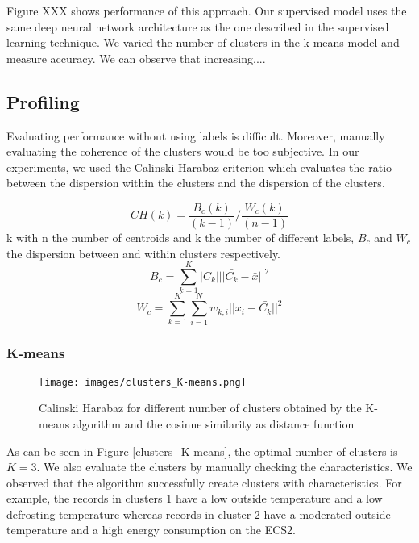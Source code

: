 \documentclass{llncs}
\begin{document}
Figure XXX shows performance of this approach. Our supervised model uses the same deep neural network architecture as the one described in the supervised learning technique. 
We varied the number of clusters in the k-means model and measure accuracy. 
We can observe that increasing....

%




\subsection{Profiling}

Evaluating performance without using labels is difficult. Moreover, manually evaluating the coherence of the clusters would be too subjective. In our experiments, we used the Calinski Harabaz criterion which evaluates the ratio between the dispersion within the clusters and the dispersion of the clusters. 

\begin{equation}
CH(k)= \frac{B_{c}(k)}{(k-1)}/\frac{W_{c}(k)}{(n-1)}
\end{equation}k
with n the number of centroids and k the number of different labels, $B_{c}$ and $W_{c}$ the dispersion between and within clusters respectively. 
\begin{equation}
B_{c} = \sum\limits_{k=1}^K |C_{k}| ||\bar{C_{k}} - \bar{x}||^{2}
\end{equation}
\begin{equation}
W_{c} = \sum\limits_{k=1}^K\sum\limits_{i=1}^N w_{k,i} ||x_{i} - \bar{C_{k}}||^{2}
\end{equation}

\subsubsection{K-means}

\begin{figure}[tb]
\centering
\texttt{[image: images/clusters\_K-means.png]}
\caption{Calinski Harabaz for different number of clusters obtained by the K-means algorithm and the cosinne similarity as distance function}
\label{fig:kmeans-scores}
\end{figure}


As can be seen in Figure \ref{clusters_K-means}, the optimal number of clusters is $K=3$. We also evaluate the clusters by manually checking the characteristics. We observed that the algorithm successfully create clusters with characteristics. For example, the records in clusters 1 have a low outside temperature and a low defrosting temperature whereas records in cluster 2 have a moderated outside temperature and a high energy consumption on the ECS2. 
\end{document}
